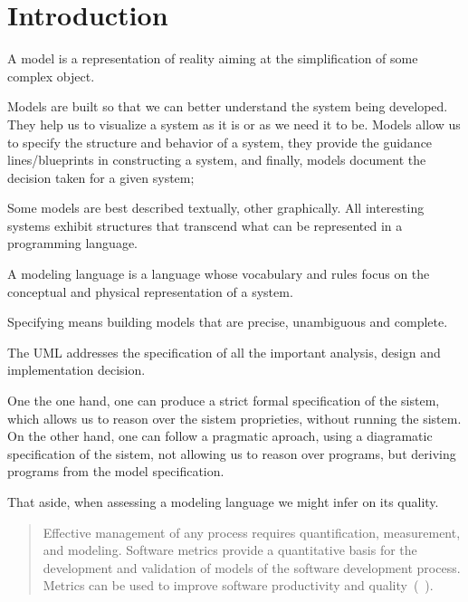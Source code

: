 \section{Introduction}

\indent
\par A model is a representation of reality aiming at the simplification of some complex object.

\par Models are built so that we can better understand the system being developed.
They help us to visualize a system as it is or as we need it to be. Models allow us to specify the structure and behavior of a system, they provide the guidance lines/blueprints in constructing a system, and finally, models document the decision taken for a given system;


\par Some models are best described textually, other graphically. All interesting systems exhibit structures that transcend what can be represented in a programming language.


\par A modeling language is a language whose vocabulary and rules focus on the conceptual and physical representation of a system.%

\par Specifying means building models that are precise, unambiguous and complete. 

The UML addresses the specification of all the important analysis, design and implementation decision. %

\par One the one hand, one can produce a strict formal specification of the sistem, which allows us to reason over the sistem proprieties, without running the sistem. On the other hand, one can follow a pragmatic aproach, using a diagramatic specification of the sistem, not allowing us to reason over programs, but deriving programs from the model specification.



\par That aside, when assessing a modeling language we might infer on its quality.
\begin{quotation}
Effective management of any process requires quantification, measurement, and modeling. Software metrics provide a quantitative basis for the development and validation of models of the software development process. Metrics can be used to improve software productivity and quality~(\cite{g1:Millis:1998}~).
\end{quotation}

